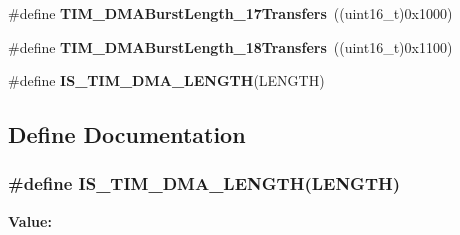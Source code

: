 \begin{DoxyCompactItemize}
\item 
\hypertarget{group__TIM__DMA__Burst__Length_ga5b2c97f650a3c1726965187d852b8cc5}{
\#define {\bfseries TIM\_\-DMABurstLength\_\-17Transfers}~((uint16\_\-t)0x1000)}
\label{group__TIM__DMA__Burst__Length_ga5b2c97f650a3c1726965187d852b8cc5}

\item 
\hypertarget{group__TIM__DMA__Burst__Length_gaed9f2afef174079f6eb6927abd995b9b}{
\#define {\bfseries TIM\_\-DMABurstLength\_\-18Transfers}~((uint16\_\-t)0x1100)}
\label{group__TIM__DMA__Burst__Length_gaed9f2afef174079f6eb6927abd995b9b}

\item 
\#define {\bfseries IS\_\-TIM\_\-DMA\_\-LENGTH}(LENGTH)
\end{DoxyCompactItemize}


\subsection{Define Documentation}
\hypertarget{group__TIM__DMA__Burst__Length_gafd09cf0887b01a15101ba7dd6e2b4ba7}{
\subsubsection[{IS\_\-TIM\_\-DMA\_\-LENGTH}]{\setlength{\rightskip}{0pt plus 5cm}\#define IS\_\-TIM\_\-DMA\_\-LENGTH(LENGTH)}}
\label{group__TIM__DMA__Burst__Length_gafd09cf0887b01a15101ba7dd6e2b4ba7}
{\bfseries Value:}

